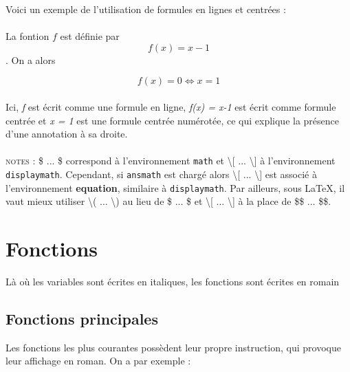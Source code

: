 \documentclass[a4paper, 10pt]{book}
\begin{document}
Voici un exemple de l'utilisation de formules en lignes et centrées : \\ \\
La fontion $f$ est définie par 
\[ f(x) = x-1 \].
On a alors 

\begin{equation}
f(x) = 0 \iff x=1
\end{equation}\\

 Ici, \textit{f} est écrit comme une formule en ligne, \textit{f(x) = x-1} est écrit comme formule centrée et \textit{x = 1} est une formule centrée numérotée, ce qui explique la présence d'une annotation à sa droite.\\ \\
\textsc{notes :} \textsf{\$ ... \$} correspond à l'environnement \texttt{math} et \textsf{\textbackslash [ ... \textbackslash ]} à l'environnement \texttt{displaymath}. Cependant, si \texttt{ansmath} est chargé alors \textsf{\textbackslash [ ... \textbackslash ]} est associé à l'environnement  \textbf{equation}, similaire à \texttt{displaymath}. Par ailleurs, sous \LaTeX, il vaut mieux utiliser \textsf{\textbackslash ( ... \textbackslash )} au lieu de \textsf{\$ ... \$} et \textsf{\textbackslash [ ... \textbackslash ]} à la place de \textsf{\$\$ ... \$\$}.

\section{Fonctions}

Là où les variables sont écrites en italiques, les fonctions sont écrites en romain

\subsection{Fonctions principales}

Les fonctions les plus courantes possèdent leur propre instruction, qui provoque leur affichage en roman. On a par exemple : 
\end{document}
